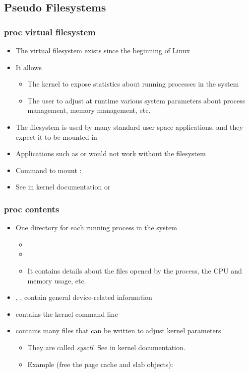 \subsection{Pseudo Filesystems}
\begin{frame}
  \frametitle{proc virtual filesystem}
  \begin{itemize}
  \item The  virtual filesystem exists since the beginning of
    Linux
  \item It allows
    \begin{itemize}
    \item The kernel to expose statistics about running processes in
      the system
    \item The user to adjust at runtime various system parameters
      about process management, memory management, etc.
    \end{itemize}
  \item The  filesystem is used by many standard user space
    applications, and they expect it to be mounted in 
  \item Applications such as  or  would not work
    without the  filesystem
  \item Command to mount :\\
  \item See  in kernel documentation
        or 
  \end{itemize}
\end{frame}

\begin{frame}
  \frametitle{proc contents}
  \begin{itemize}
  \item One directory for each running process in the system
    \begin{itemize}
    \item {}
    \item {}
    \item It contains details about the files opened by the process,
      the CPU and memory usage, etc.
    \end{itemize}
  \item {}, ,
     contain general device-related information
  \item {} contains the kernel command line
  \item {} contains many files that can be written to
    adjust kernel parameters
    \begin{itemize}
    \item They are called {\em sysctl}. See 
      in kernel documentation.
    \item Example (free the page cache and slab objects):\\
    \end{itemize}
  \end{itemize}
\end{frame}

